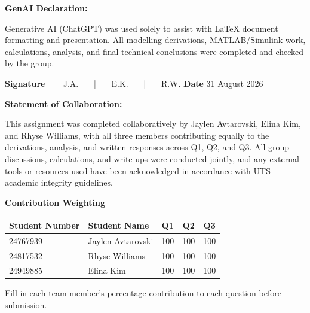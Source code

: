 \documentclass[11pt,a4paper]{article}
\begin{document}
{\begin{minipage}{\dimexpr\textwidth-2\fboxsep-2\fboxrule\relax}
\vspace{6pt}
\textbf{GenAI Declaration:}\par
\vspace{2pt}
Generative AI (ChatGPT) was used solely to assist with LaTeX document
formatting and presentation. All modelling derivations, MATLAB/Simulink work,
calculations, analysis, and final technical conclusions were completed and
checked by the group.\par

\vspace{12pt}
\textbf{Signature} \,\,\,\,\,\,\,\,\, J.A. \,\,\,\,\,\,\,\,\,|\,\,\,\,\,\,\,\,\, E.K. \,\,\,\,\,\,\,\,\,|\,\,\,\,\,\,\,\,\, R.W. \hfill \textbf{Date} 31 August 2026\par

\vspace{10pt}
\textbf{Statement of Collaboration:}\par
\vspace{2pt}
This assignment was completed collaboratively by Jaylen Avtarovski, Elina Kim, 
and Rhyse Williams, with all three members contributing equally to the derivations, 
analysis, and written responses across Q1, Q2, and Q3. All group discussions, 
calculations, and write-ups were conducted jointly, and any external tools or 
resources used have been acknowledged in accordance with UTS academic 
integrity guidelines.
\vspace{6pt}
\end{minipage}}

\vfill

\newpage

\begin{center}
\textbf{Contribution Weighting}\par
\vspace{4pt}
\begin{tabular}{|l|l|c|c|c|}
\hline
\textbf{Student Number} & \textbf{Student Name} & \textbf{Q1} & \textbf{Q2} & \textbf{Q3}\\
\hline
24767939 & Jaylen Avtarovski & 100 & 100 & 100\\ \hline
24817532 & Rhyse Williams & 100 & 100 & 100\\ \hline
24949885 & Elina Kim & 100 & 100 & 100\\ \hline
\end{tabular}
\end{center}

\vspace{6pt}
{\small Fill in each team member's percentage contribution to each question
before submission.}
\end{document}
